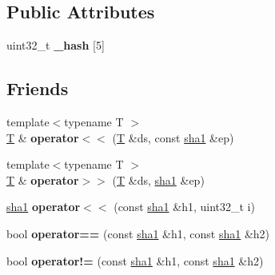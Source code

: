 \subsection*{Public Attributes}
\begin{DoxyCompactItemize}
\item 
\mbox{\label{classfc_1_1sha1_a1ee203495960ef64095b49a08ce5fa5a}} 
uint32\+\_\+t {\bfseries \+\_\+hash} \mbox{[}5\mbox{]}
\end{DoxyCompactItemize}
\subsection*{Friends}
\begin{DoxyCompactItemize}
\item 
\mbox{\label{classfc_1_1sha1_ac685065417ff085f1017dc4467388e40}} 
{\footnotesize template$<$typename T $>$ }\\\mbox{\hyperlink{struct_t}{T}} \& {\bfseries operator$<$$<$} (\mbox{\hyperlink{struct_t}{T}} \&ds, const \mbox{\hyperlink{classfc_1_1sha1}{sha1}} \&ep)
\item 
\mbox{\label{classfc_1_1sha1_a3d5b190f2ef8f6b5bad4f7337cbe67c8}} 
{\footnotesize template$<$typename T $>$ }\\\mbox{\hyperlink{struct_t}{T}} \& {\bfseries operator$>$$>$} (\mbox{\hyperlink{struct_t}{T}} \&ds, \mbox{\hyperlink{classfc_1_1sha1}{sha1}} \&ep)
\item 
\mbox{\label{classfc_1_1sha1_a8e87d2be9b06c7113b57a2b8455fdc22}} 
\mbox{\hyperlink{classfc_1_1sha1}{sha1}} {\bfseries operator$<$$<$} (const \mbox{\hyperlink{classfc_1_1sha1}{sha1}} \&h1, uint32\+\_\+t i)
\item 
\mbox{\label{classfc_1_1sha1_a6fd867d656b30cba0f59d8add436aa1a}} 
bool {\bfseries operator==} (const \mbox{\hyperlink{classfc_1_1sha1}{sha1}} \&h1, const \mbox{\hyperlink{classfc_1_1sha1}{sha1}} \&h2)
\item 
\mbox{\label{classfc_1_1sha1_ae8f29de32bb50a15b7d68b60d1b4f4f7}} 
bool {\bfseries operator!=} (const \mbox{\hyperlink{classfc_1_1sha1}{sha1}} \&h1, const \mbox{\hyperlink{classfc_1_1sha1}{sha1}} \&h2)
\item 

\end{DoxyCompactItemize}
